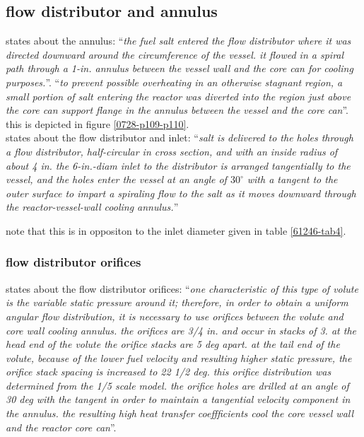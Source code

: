 \documentclass{article}
\begin{document}
\subsection{flow distributor and annulus}
\textcite[page 112 and 114]{ornl-tm-3039} states about the annulus:
\enquote{\textit{the fuel salt entered the flow distributor where it was directed downward around the circumference of the vessel. it flowed in a spiral path through a 1-in. annulus between the vessel wall and the core can for cooling purposes.}}. \enquote{\textit{to prevent possible overheating in an otherwise stagnant region, a small portion of salt entering the reactor was diverted into the region just above the core can support flange in the annulus between the vessel and the core can}}.
this is depicted in figure \ref{0728-p109-p110}. \\

\parencite[page 108]{ornl-tm-0728} states about the flow distributor and inlet:
\enquote{\textit{salt is delivered to the holes through a flow distributor, half-circular in cross section, and with an inside radius of about 4 in. the 6-in.-diam inlet to the distributor is arranged tangentially to the vessel, and the holes enter the vessel at an angle of $30^\circ$ with a tangent to the outer surface to impart a spiraling flow to the salt as it moves downward through the reactor-vessel-wall cooling annulus.}}

note that this is in oppositon to the inlet diameter given in table \ref{61246-tab4}.

\subsubsection{flow distributor orifices}
\textcite[page 9-10]{ornl-tm-3229} states about the flow distributor orifices:
\enquote{\textit{one characteristic of this type of volute is the variable static pressure around it; therefore, in order to obtain a uniform angular flow distribution, it is necessary to use orifices between the volute and core wall cooling annulus. the orifices are 3/4 in. and occur in stacks of 3. at the head end of the volute the orifice stacks are 5 deg apart. at the tail end of the volute, because of the lower fuel velocity and resulting higher static pressure, the orifice stack spacing is increased to 22 1/2 deg. this orifice distribution was determined from the 1/5 scale model. the orifice holes are drilled at an angle of 30 deg with the tangent in order to maintain a tangential velocity component in the annulus. the resulting high heat transfer coeffficients cool the core vessel wall and the reactor core can}}.
\end{document}
